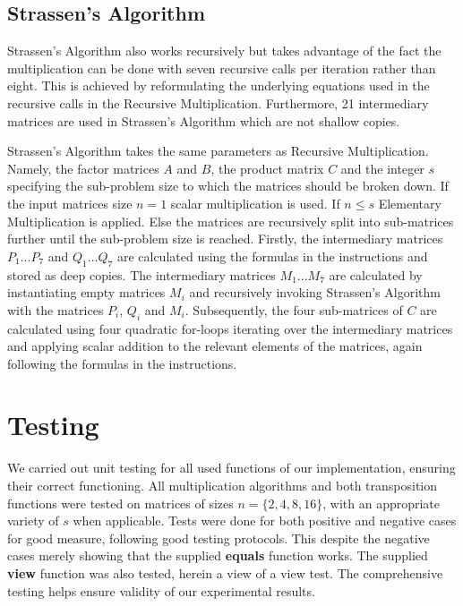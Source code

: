 \documentclass[12pt, a4paper]{article}
\begin{document}
\subsection{Strassen's Algorithm}

Strassen's Algorithm also works recursively but takes advantage of the fact the multiplication can be done with seven recursive calls per iteration rather than eight. This is achieved by reformulating the underlying equations used in the recursive calls in the Recursive Multiplication. Furthermore, 21 intermediary matrices are used in Strassen's Algorithm which are not shallow copies.

Strassen's Algorithm takes the same parameters as Recursive Multiplication. Namely, the factor matrices $A$ and $B$, the product matrix $C$ and the integer $s$ specifying the sub-problem size to which the matrices should be broken down. If the input matrices size $n = 1$ scalar multiplication is used. If $n \leq s$ Elementary Multiplication is applied. Else the matrices are recursively split into sub-matrices further until the sub-problem size is reached. Firstly, the intermediary matrices $P_1 ... P_7$ and $Q_1 ... Q_7$ are calculated using the formulas in the instructions and stored as deep copies. The intermediary matrices $M_1 ... M_7$ are calculated by instantiating empty matrices $M_i$ and recursively invoking Strassen's Algorithm with the matrices $P_i$, $Q_i$ and $M_i$. Subsequently, the four sub-matrices of $C$ are calculated using four quadratic for-loops iterating over the intermediary matrices and applying scalar addition to the relevant elements of the matrices, again following the formulas in the instructions.

\section{Testing}
We carried out unit testing for all used functions of our implementation, ensuring their correct functioning. All multiplication algorithms and both transposition functions were tested on matrices of sizes $n=\{2,4,8,16\}$, with an appropriate variety of $s$ when applicable. Tests were done for both positive and negative cases for good measure, following good testing protocols. This despite the negative cases merely showing that the supplied \textbf{equals} function works. The supplied \textbf{view} function was also tested, herein a view of a view test. The comprehensive testing helps ensure validity of our experimental results.
\end{document}
